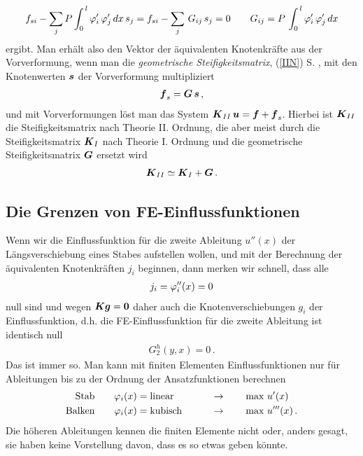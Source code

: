 {{{{{{\begin{align}
f_{si} - \sum_j P \int_0^{\,l} \varphi_i'\,\varphi_j'\,dx\,s_j =  f_{si} - \sum_j\,G_{ij}\,s_j = 0\qquad G_{ij} = P\,\int_0^{\,l} \varphi_i'\,\varphi_j'\,dx
\end{align}
ergibt. Man erh\"{a}lt also den Vektor der \"{a}quivalenten Knotenkr\"{a}fte aus der Vorverformung, wenn man die {\em geometrische Steifigkeitsmatrix\/}, (\ref{IIN}) S. \pageref{IIN}, mit den Knotenwerten $\mbox{\boldmath $s$}$ der Vorverformung multipliziert
\begin{align}
\mbox{\boldmath $f$}_s = \mbox{\boldmath $G$}\,\mbox{\boldmath $s$}\,,
\end{align}
und mit Vorverformungen l\"{o}st man das System $\mbox{\boldmath $K$}_{II}\,\mbox{\boldmath $u$} = \mbox{\boldmath $f$} + \mbox{\boldmath $f$}_s$. Hierbei ist $\mbox{\boldmath $K$}_{II}$ die Steifigkeitsmatrix nach Theorie II. Ordnung, die aber meist durch die Steifigkeitsmatrix $\mbox{\boldmath $K$}_I$ nach Theorie I. Ordnung und die geometrische Steifigkeitsmatrix $\mbox{\boldmath $G$}$ ersetzt wird
\begin{align}
\mbox{\boldmath $K$}_{II} \simeq \mbox{\boldmath $K$}_I + \mbox{\boldmath $G$}\,.
\end{align}


{\textcolor{sectionTitleBlue}{\section{Die Grenzen von FE-Einflussfunktionen}}}
Wenn wir die Einflussfunktion f\"{u}r die zweite Ableitung $u''(x)$ der L\"{a}ngsverschiebung eines Stabes aufstellen wollen, und mit der Berechnung der \"{a}quivalenten Knotenkr\"{a}ften $j_i$ beginnen, dann merken wir schnell, dass alle
\begin{align}
j_i = \varphi_i''(x) = 0
\end{align}
null sind und wegen $\mbox{\boldmath $K$}\mbox{\boldmath $g$} = \mbox{\boldmath $0$}$ daher auch die Knotenverschiebungen $g_i$ der Einflussfunktion, d.h. die FE-Einflussfunktion f\"{u}r die zweite Ableitung ist identisch null
\begin{align}
G_2^h(y,x ) = 0\,.
\end{align}
Das ist immer so. Man kann mit finiten Elementen Einflussfunktionen nur f\"{u}r Ableitungen bis zu der Ordnung der Ansatzfunktionen berechnen
\begin{align}
\text{Stab} \qquad \varphi_i(x) &= \text{linear} &&\qquad \rightarrow \qquad \text{max $u'(x)$}\\
\text{Balken} \qquad \varphi_i(x) &= \text{kubisch} &&\qquad \rightarrow \qquad \text{max $u'''(x)$}\,.
\end{align}
Die h\"{o}heren Ableitungen kennen die finiten Elemente nicht oder, anders gesagt, sie haben keine Vorstellung davon, dass es so etwas geben k\"{o}nnte.\\

}}}}}}
